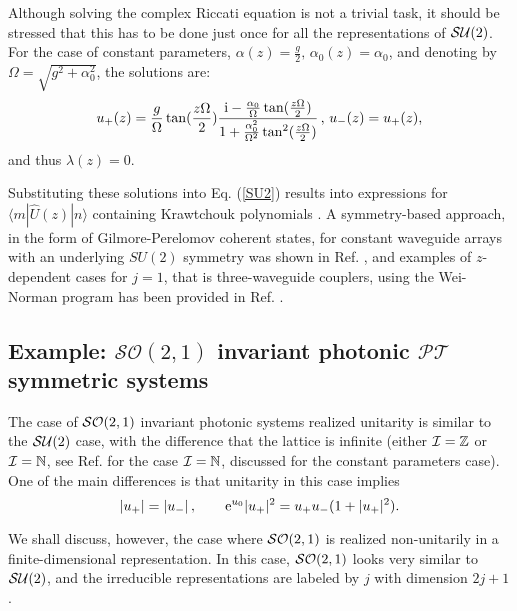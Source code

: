 \documentclass[12pt]{iopart}
\newcommand{\bra}[1]{ \langle #1|}
\newcommand{\ket}[1]{ |#1\rangle}
\begin{document}
Although solving the complex Riccati equation is not a trivial task, it should be stressed that this has to be done
just once for all the representations of ${\cal SU}(2)$. For the case of
constant parameters, $\alpha(z)=\frac{g}{2},
\,\alpha_0(z)=\alpha_{0}$, and denoting by $\Omega=\sqrt{g^2+\alpha_{0}^2}$, the solutions are:
%
\begin{equation}
u_+(z)=\frac{g}{\Omega}\tan(\frac{z \Omega}{2})\frac{{\rm i}-\frac{\alpha_{0}}{\Omega} \tan(\frac{z \Omega}{2})}{1+\frac{\alpha_{0}^2}{\Omega^2}\tan^2(\frac{z \Omega}{2})}\,,\,
u_-(z)=u_+(z),
\end{equation}
%
and thus $\lambda(z)=0$.



Substituting these solutions into Eq. (\ref{SU2}) results into expressions for $\bra{m}\hat{U}(z)\ket{n}$  containing
Krawtchouk polynomials \cite{OrthogonalPolynomials,WolfKravchuk}. A symmetry-based approach, in the form of Gilmore-Perelomov coherent states, for constant waveguide arrays with an underlying $SU(2)$ symmetry was shown in Ref. \cite{GilmorePerelomovCS}, and examples of $z$-dependent cases for  $j=1$, that is three-waveguide couplers, using the Wei-Norman program has been provided in Ref. \cite{RodriguezLara2014p013802}.




\subsection{Example: ${\mathcal{SO}}(2,1)$ invariant photonic $\mathcal{PT}$ symmetric systems}

The case of ${\cal SO}(2,1)$ invariant photonic systems realized unitarity is similar to the ${\cal SU}(2)$ case, with the
difference that the lattice is infinite (either ${\cal I}=\mathbb{Z}$ or ${\cal I}=\mathbb{N}$, see Ref. \cite{GilmorePerelomovCS}
for the case ${\cal I}=\mathbb{N}$, discussed for the constant parameters case). One of the main differences is that
unitarity  in this case implies
%
\begin{equation}
|u_+|=|u_-|\,,\qquad {\rm e}^{u_0}|u_+|^2=u_+ u_-(1+|u_+|^2).
\label{unitaritySO21}
\end{equation}

We shall discuss, however, the case where ${\cal SO}(2,1)$ is realized non-unitarily in a finite-dimensional representation. In this case, ${\cal SO}(2,1)$ looks very similar to ${\cal SU}(2)$, and the irreducible representations are labeled by
$j$ with dimension $2j+1$.
\end{document}

